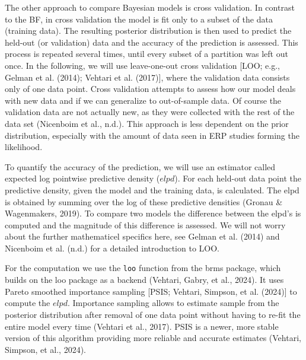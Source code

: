 \documentclass[
  doc,12pt,floatsintext]{apa7}
\begin{document}
The other approach to compare Bayesian models is cross validation. In contrast to the BF, in cross validation the model is fit only to a subset of the data (training data). The resulting posterior distribution is then used to predict the held-out (or validation) data and the accuracy of the prediction is assessed. This process is repeated several times, until every subset of a partition was left out once. In the following, we will use leave-one-out cross validation {[}LOO; e.g., Gelman et al. (2014); Vehtari et al. (2017){]}, where the validation data consists only of one data point. Cross validation attempts to assess how our model deals with new data and if we can generalize to out-of-sample data. Of course the validation data are not actually new, as they were collected with the rest of the data set (Nicenboim et al., n.d.). This approach is less dependent on the prior distribution, especially with the amount of data seen in ERP studies forming the likelihood.

To quantify the accuracy of the prediction, we will use an estimator called expected log pointwise predictive density (\(elpd\)). For each held-out data point the predictive density, given the model and the training data, is calculated. The elpd is obtained by summing over the log of these predictive densities (Gronau \& Wagenmakers, 2019). To compare two models the difference between the elpd's is computed and the magnitude of this difference is assessed. We will not worry about the further mathematicel specifics here, see Gelman et al. (2014) and Nicenboim et al. (n.d.) for a detailed introduction to LOO.

For the computation we use the \texttt{loo} function from the brms package, which builds on the loo package as a backend (Vehtari, Gabry, et al., 2024). It uses Pareto smoothed importance sampling {[}PSIS; Vehtari, Simpson, et al. (2024){]} to compute the \(elpd\). Importance sampling allows to estimate sample from the posterior distribution after removal of one data point without having to re-fit the entire model every time (Vehtari et al., 2017). PSIS is a newer, more stable version of this algorithm providing more reliable and accurate estimates (Vehtari, Simpson, et al., 2024).
\end{document}
